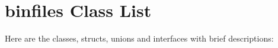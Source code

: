 \section{binfiles Class List}
Here are the classes, structs, unions and interfaces with brief descriptions:\begin{CompactList}
\item{}
\item{}
\end{CompactList}
